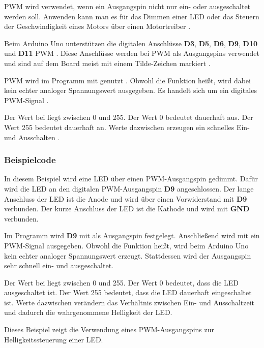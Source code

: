 PWM wird verwendet, wenn ein Ausgangspin nicht nur ein- oder ausgeschaltet werden soll. Anwenden kann man es für das Dimmen einer LED oder das Steuern der Geschwindigkeit eines Motors über einen Motortreiber \cite{arduino:analogwrite}.



Beim Arduino Uno unterstützen die digitalen Anschlüsse \textbf{D3}, \textbf{D5}, \textbf{D6}, \textbf{D9}, \textbf{D10} und \textbf{D11} PWM \cite{arduino:uno-r3}\cite{arduino:uno-datasheet}. Diese Anschlüsse werden bei PWM als Ausgangspins verwendet und sind auf dem Board meist mit einem Tilde-Zeichen markiert \cite{arduino:uno-components}.

PWM wird im Programm mit  genutzt \cite{arduino:analogwrite}. Obwohl die Funktion  heißt, wird dabei kein echter analoger Spannungswert ausgegeben. Es handelt sich um ein digitales PWM-Signal \cite{arduino:analogwrite}.

Der Wert bei  liegt zwischen 0 und 255. Der Wert 0 bedeutet dauerhaft aus. Der Wert 255 bedeutet dauerhaft an. Werte dazwischen erzeugen ein schnelles Ein- und Ausschalten \cite{arduino:analogwrite}.

\subsubsection{Beispielcode}

In diesem Beispiel wird eine LED über einen PWM-Ausgangspin gedimmt. Dafür wird die LED an den digitalen PWM-Ausgangspin \textbf{D9} angeschlossen. Der lange Anschluss der LED ist die Anode und wird über einen Vorwiderstand mit \textbf{D9} verbunden. Der kurze Anschluss der LED ist die Kathode und wird mit \textbf{GND} verbunden.

Im Programm wird \textbf{D9} mit  als Ausgangspin festgelegt. Anschließend wird mit  ein PWM-Signal ausgegeben. Obwohl die Funktion  heißt, wird beim Arduino Uno kein echter analoger Spannungswert erzeugt. Stattdessen wird der Ausgangspin sehr schnell ein- und ausgeschaltet.

Der Wert bei  liegt zwischen 0 und 255. Der Wert 0 bedeutet, dass die LED ausgeschaltet ist. Der Wert 255 bedeutet, dass die LED dauerhaft eingeschaltet ist. Werte dazwischen verändern das Verhältnis zwischen Ein- und Ausschaltzeit und dadurch die wahrgenommene Helligkeit der LED.

Dieses Beispiel zeigt die Verwendung eines PWM-Ausgangspins zur Helligkeitssteuerung einer LED.


